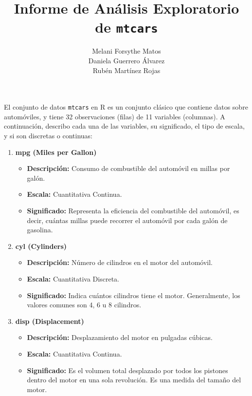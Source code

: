 \documentclass{article}
\title{Informe de Análisis Exploratorio de \texttt{mtcars}}
\author{
      Melani Forsythe Matos \\
      Daniela Guerrero Álvarez \\
      Rubén Martínez Rojas
    }
\date{} %
\begin{document}
\maketitle

\newpage %


El conjunto de datos \texttt{mtcars} en R es un conjunto clásico que contiene datos sobre automóviles, y tiene 32 observaciones (filas) de 11 variables (columnas). A continuación, describo cada una de las variables, su significado, el tipo de escala, y si son discretas o continuas:

\begin{enumerate}
    \item \textbf{mpg (Miles per Gallon)}

          \begin{itemize}
              \item \textbf{Descripción:} Consumo de combustible del automóvil en millas por galón.
              \item \textbf{Escala:} Cuantitativa Continua.
              \item \textbf{Significado:} Representa la eficiencia del combustible del automóvil, es decir, cuántas millas puede recorrer el automóvil por cada galón de gasolina.
          \end{itemize}

    \item \textbf{cyl (Cylinders)}

          \begin{itemize}
              \item \textbf{Descripción:} Número de cilindros en el motor del automóvil.
              \item \textbf{Escala:} Cuantitativa Discreta.
              \item \textbf{Significado:} Indica cuántos cilindros tiene el motor. Generalmente, los valores comunes son 4, 6 u 8 cilindros.
          \end{itemize}

    \item \textbf{disp (Displacement)}

          \begin{itemize}
              \item \textbf{Descripción:} Desplazamiento del motor en pulgadas cúbicas.
              \item \textbf{Escala:} Cuantitativa Continua.
              \item \textbf{Significado:} Es el volumen total desplazado por todos los pistones dentro del motor en una sola revolución. Es una medida del tamaño del motor.
          \end{itemize}


\end{enumerate}
\end{document}
